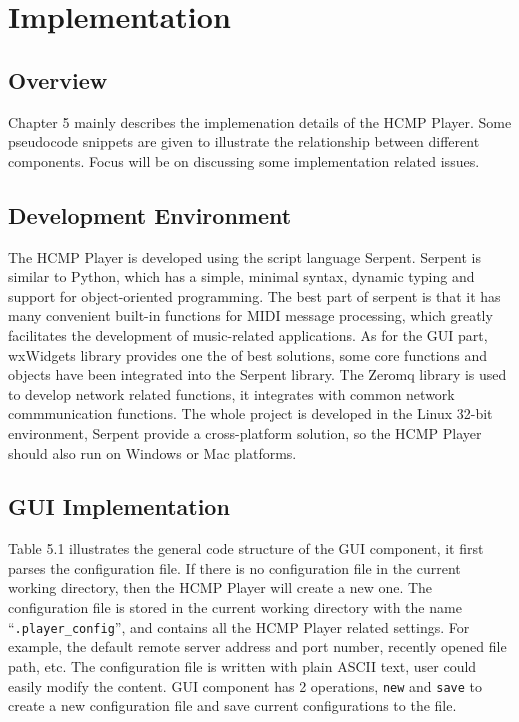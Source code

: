 
\chapter{Implementation} %



\ifpdf
    \graphicspath{{X/figures/PNG/}{X/figures/PDF/}{X/figures/}}
\else
    \graphicspath{{X/figures/EPS/}{X/figures/}}
\fi

\section{Overview}
Chapter 5 mainly describes the implemenation details of the HCMP Player. Some 
pseudocode snippets are given to illustrate the relationship between 
different components. 
Focus will be on discussing some implementation related issues. 

\section{Development Environment}

The HCMP Player is developed using the script language 
Serpent\cite{Serpent}. Serpent is similar to Python, which has a simple, 
minimal syntax, dynamic typing and support for object-oriented programming. 
The best part of serpent is 
that it has many convenient built-in functions for MIDI message processing, 
which greatly facilitates the development of music-related applications. 
As for the GUI part, wxWidgets \cite{wxWidget} library provides one the of best 
solutions, some core functions and objects have been integrated into the Serpent 
library. The Zeromq library is used to develop network related functions, it 
integrates with common network commmunication functions. The whole project 
is developed in the Linux 32-bit environment, Serpent provide a cross-platform solution, 
so the HCMP Player should also run on Windows or Mac platforms.

\section{GUI Implementation}
Table 5.1 illustrates the general code structure of the GUI component, 
it first parses the configuration file. If there is no configuration file 
in the current working directory, then the HCMP Player will create a new one.
The configuration file is stored in the current working directory with 
the name ``\texttt{.player\_config}'', and contains all the HCMP Player  
related settings. For example, the default remote server address and 
port number, recently opened file path, etc. The configuration file is written 
with plain ASCII text, user could easily modify the content. GUI 
component has 2 operations, \texttt{new} and \texttt{save} to create a new 
configuration file and save current configurations to the file.


